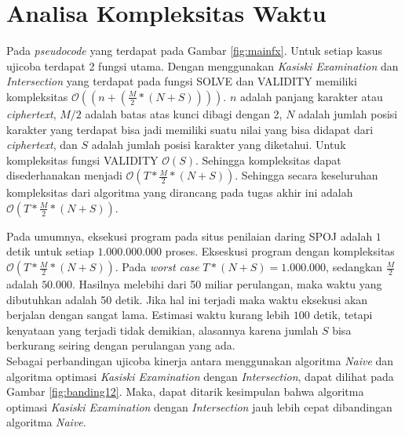 \section{Analisa Kompleksitas Waktu}
Pada \textit{pseudocode} yang terdapat pada Gambar \ref{fig:mainfx}. Untuk setiap kasus ujicoba terdapat 2 fungsi utama. Dengan menggunakan \textit{Kasiski Examination} dan \textit{Intersection} yang terdapat pada fungsi SOLVE dan VALIDITY memiliki kompleksitas $\mathcal{O}((n+(\frac{M}{2}*(N+S))))$. $n$ adalah panjang karakter \plaintext atau \textit{ciphertext}, $M/2$ adalah batas atas kunci dibagi dengan 2, $N$ adalah jumlah posisi karakter yang terdapat bisa jadi memiliki suatu nilai yang bisa didapat dari \textit{ciphertext}, dan $S$ adalah jumlah posisi karakter yang diketahui. Untuk kompleksitas fungsi VALIDITY $\mathcal{O}(S)$. Sehingga kompleksitas dapat disederhanakan menjadi $\mathcal{O}(T*\frac{M}{2}*(N+S))$.
\indent Sehingga secara keseluruhan kompleksitas dari algoritma yang dirancang pada tugas akhir ini adalah $\mathcal{O}(T*\frac{M}{2}*(N+S))$.

Pada umumnya, eksekusi program pada situs penilaian daring SPOJ adalah $ 1 $ detik untuk setiap $ 1.000.000.000 $ proses. Ekseskusi program dengan kompleksitas $\mathcal{O}(T*\frac{M}{2}*(N+S))$. Pada \textit{worst case} $T*(N+S)=1.000.000$, sedangkan $\frac{M}{2}$ adalah $50.000$. Hasilnya melebihi dari 50 miliar perulangan, maka waktu yang dibutuhkan adalah 50 detik. Jika hal ini terjadi maka waktu eksekusi akan berjalan dengan sangat lama. Estimasi waktu kurang lebih $100$ detik, tetapi kenyataan yang terjadi tidak demikian, alasannya karena jumlah $S$ bisa berkurang seiring dengan perulangan yang ada.
\\
Sebagai perbandingan ujicoba kinerja antara menggunakan algoritma \textit{Naive} dan algoritma optimasi \textit{Kasiski Examination} dengan \textit{Intersection}, dapat dilihat pada Gambar \ref{fig:banding12}. Maka, dapat ditarik kesimpulan bahwa algoritma optimasi \textit{Kasiski Examination} dengan \textit{Intersection} jauh lebih cepat dibandingan algoritma \textit{Naive}.
	
